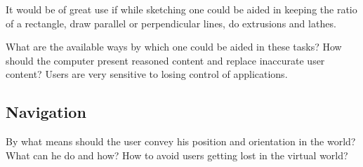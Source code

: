 It would be of great use if while sketching one could be aided in keeping the ratio of
a rectangle, draw parallel or perpendicular lines, do extrusions and lathes.

What are the available ways by which one could be aided in these tasks?
How should the computer present reasoned content and replace inaccurate user content?
Users are very sensitive to losing control of applications.


\subsection{Navigation}
By what means should the user convey his position and orientation in the world?
What can he do and how? How to avoid users getting lost in the virtual world?

